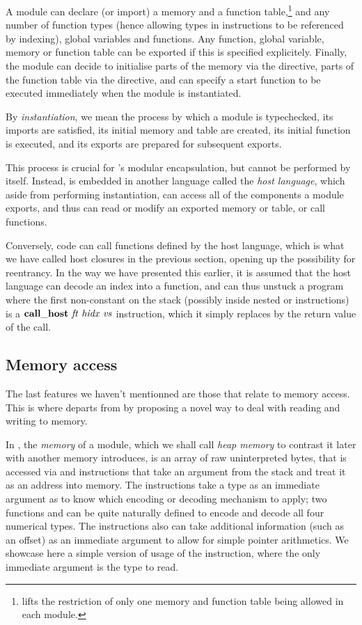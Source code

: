\documentclass[acmsmall,screen]{acmart}\settopmatter{}
\begin{document}
A module can declare (or import) a memory and a function table,\footnote{ lifts the restriction of only one memory and function table being allowed in each module.} and any number of function types (hence allowing types in  instructions to be referenced by indexing), global variables and functions. Any function, global variable, memory or function table can be exported if this is specified explicitely. Finally, the module can decide to initialise parts of the memory via the  directive, parts of the function table via the  directive, and can specify a start function to be executed immediately when the module is instantiated.

By \emph{instantiation}, we mean the process by which a module is typechecked, its imports are satisfied, its initial memory and table are created, its initial function is executed, and its exports are prepared for subsequent exports.

This process is crucial for \wasm's modular encapsulation, but cannot be performed by \wasm itself. Instead, \wasm is embedded in another language called the \emph{host language}, which aside from performing instantiation, can access all of the components a \wasm module exports, and thus can read or modify an exported memory or table, or call \wasm functions.

Conversely, \wasm code can call functions defined by the host language, which is what we have called host closures in the previous section, opening up the possibility for reentrancy. In the way we have presented this earlier, it is assumed that the host language can decode an index  into a function, and can thus unstuck a program where the first non-constant on the stack (possibly inside nested  or  instructions) is a \( \mathbf{call\_host}~\mathit{ft}~\mathit{hidx}~\mathit{vs} \) instruction, which it simply replaces by the return value of the call.

\subsection{Memory access}
\label{sec:memory}

The last features we haven't mentionned are those that relate to memory access. This is where \mswasm departs from \wasm by proposing a novel way to deal with reading and writing to memory.

In \wasm, the \emph{memory} of a module, which we shall call \emph{heap memory} to contrast it later with another memory \mswasm introduces, is an array of raw uninterpreted bytes, that is accessed via \xxWload and \xxWstore instructions that take an \xxWithirtytwo argument from the stack and treat it as an address into memory. The instructions take a type as an immediate argument as to know which encoding or decoding mechanism to apply; two functions \xxWserialise and \xxWdeserialise can be quite naturally defined to encode and decode all four numerical types. The instructions also can take additional information (such as an offset) as an immediate argument to allow for simple pointer arithmetics. We showcase here a simple version of usage of the \xxWload instruction, where the only immediate argument is the type to read.
\end{document}
